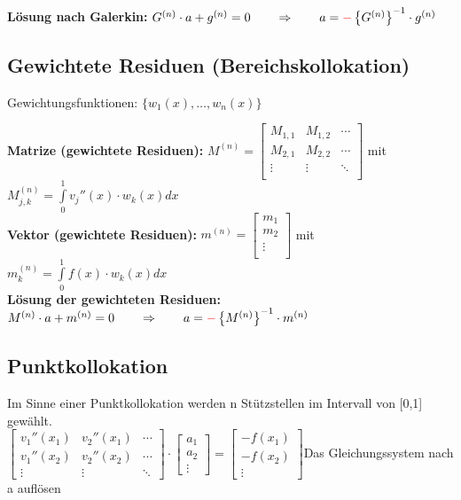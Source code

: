 \textbf{Lösung nach Galerkin:} $G^{(n)}\cdot a+g^{(n)}=0\qquad \Rightarrow \qquad a=\textcolor{red}{\mathbf{-}}\left\{G^{(n)}\right\}^{-1}\cdot g^{(n)}$


\subsection{Gewichtete Residuen (Bereichskollokation)}

Gewichtungsfunktionen: $\{w_1(x),\ldots,w_n(x)\}$

\textbf{Matrize (gewichtete Residuen): }
$M^{(n)}=\begin{bmatrix}
	M_{1,1}& M_{1,2}&\cdots\\
	M_{2,1}& M_{2,2}&\cdots\\
	\vdots & \vdots &\ddots\\
\end{bmatrix}$ \qquad mit \qquad $M_{j,k}^{(n)}=\int\limits_{0}^{1}{v_j''(x)\cdot w_k(x) dx}$\\
\textbf{Vektor (gewichtete Residuen): } 
$m^{(n)}=\begin{bmatrix}
	m_1\\
	m_2\\
	\vdots\\
\end{bmatrix}$ \qquad mit \qquad $m_{k}^{(n)}=\int\limits_{0}^{1}{f(x)\cdot w_k(x) dx}$\\

\textbf{Lösung der gewichteten Residuen:} $M^{(n)}\cdot a+m^{(n)}=0\qquad \Rightarrow \qquad a=\textcolor{red}{\mathbf{-}}\left\{M^{(n)}\right\}^{-1}\cdot m^{(n)}$

\subsection{Punktkollokation}
Im Sinne einer Punktkollokation werden n Stützstellen im Intervall von [0,1] gewählt.\\

$\begin{bmatrix}
	v_1''(x_1)& v_2''(x_1)&\cdots\\
	v_1''(x_2)& v_2''(x_2)&\cdots\\
	\vdots& \vdots&\ddots
\end{bmatrix}\cdot
\begin{bmatrix}
a_1\\
a_2\\
\vdots
\end{bmatrix}
=\begin{bmatrix}
-f(x_1)\\
-f(x_2)\\
\vdots
\end{bmatrix}$\qquad Das Gleichungssystem nach a auflösen

